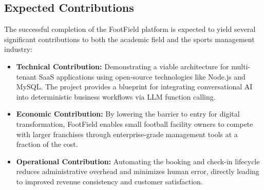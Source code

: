 \subsection{Expected Contributions}
The successful completion of the FootField platform is expected to yield several significant contributions to both the academic field and the sports management industry:

\begin{itemize}
    \item \textbf{Technical Contribution:} Demonstrating a viable architecture for multi-tenant SaaS applications using open-source technologies like Node.js and MySQL. The project provides a blueprint for integrating conversational AI into deterministic business workflows via LLM function calling.
    \item \textbf{Economic Contribution:} By lowering the barrier to entry for digital transformation, FootField enables small football facility owners to compete with larger franchises through enterprise-grade management tools at a fraction of the cost.
    \item \textbf{Operational Contribution:} Automating the booking and check-in lifecycle reduces administrative overhead and minimizes human error, directly leading to improved revenue consistency and customer satisfaction.
\end{itemize}
